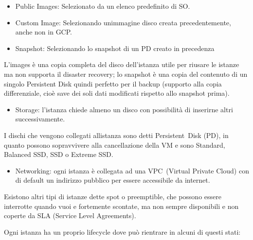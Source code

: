 \documentclass[
]{article}
\providecommand{\tightlist}{%
  \setlength{\itemsep}{0pt}\setlength{\parskip}{0pt}}
\begin{document}
\begin{itemize}
\tightlist
\item
  {Public Images}{: Selezionato da un elenco predefinito di SO.}
\item
  {Custom Image}{: Selezionando un\textquotesingle immagine disco creata
  precedentemente, anche non in GCP.}
\item
  {Snapshot}{: Selezionando lo snapshot di un PD creato in precedenza}
\end{itemize}

{}

{L'images è una copia completa del disco dell'istanza utile per riusare
le istanze ma non supporta il disaster recovery; lo snapshot è una copia
del contenuto di un singolo Persistent Disk quindi perfetto per il
backup (supporto alla copia differenziale, cioè save dei soli dati
modificati rispetto allo snapshot prima).}

{}

\begin{itemize}
\tightlist
\item
  {Storage}{: l'istanza chiede almeno un disco con possibilità di
  inserirne altri successivamente.}
\end{itemize}

{I dischi che vengono collegati all\textquotesingle istanza sono detti
}{Persistent}{~Disk (PD), in quanto possono sopravvivere alla
cancellazione della VM e sono }{Standard}{, }{Balanced SSD}{, }{SSD }{o
}{Extreme SSD}{.}

{}

\begin{itemize}
\tightlist
\item
  {N}{etworking}{: ogni istanza è collegata ad una }{VPC}{~(Virtual
  Private Cloud) con di default un indirizzo pubblico per essere
  accessibile da internet.}
\end{itemize}

{}

{Esistono altri tipi di istanze dette }{spot }{o }{preemptible}{, che
possono essere interrotte quando vuoi e fortemente scontate, ma non
sempre disponibili e non coperte da SLA (Service Level Agreements).}

{}

{}

{}

{}

{Ogni istanza ha un proprio lifecycle dove può rientrare in alcuni di
questi stati:}
\end{document}
